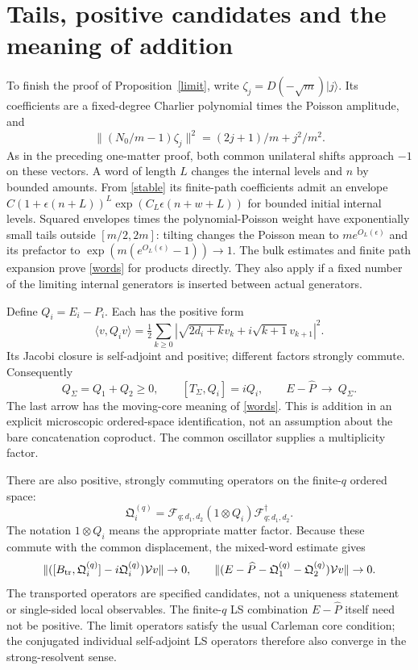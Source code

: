 \documentclass[11pt]{article}
\newcommand{\eps}{\epsilon}
\newcommand{\ket}[1]{|#1\rangle}
\newcommand{\PP}{\widehat P}
\newcommand{\Bt}{B_{\rm tr}}
\newcommand{\V}{\mathcal V}
\begin{document}
\newpage
\section{Tails, positive candidates and the meaning of addition}
To finish the proof of Proposition~\ref{limit}, write
$\zeta_j=D(-\sqrt m)\ket j$.
Its coefficients are a fixed-degree Charlier polynomial times
the Poisson amplitude, and
\[
 \|(N_0/m-1)\zeta_j\|^2=(2j+1)/m+j^2/m^2.
\]
As in the preceding one-matter proof, both common unilateral
shifts approach $-1$ on these vectors. A word of length $L$
changes the internal levels and $n$ by bounded amounts.
From \eqref{stable} its finite-path coefficients admit an envelope
$C(1+\eps(n+L))^L\exp(C_L\eps(n+w+L))$ for bounded
initial internal levels. Squared envelopes times the
polynomial-Poisson weight have exponentially small tails
outside $[m/2,2m]$: tilting changes the Poisson mean to
$me^{O_L(\eps)}$ and its prefactor to
$\exp(m(e^{O_L(\eps)}-1))\to1$.
The bulk estimates and finite path expansion prove \eqref{words}
for products directly. They also apply if a fixed number of the
limiting internal generators is inserted between actual generators.

Define $Q_i=E_i-P_i$. Each has the positive form
\[
 \langle v,Q_i v\rangle=\tfrac12\sum_{k\ge0}
 |\sqrt{2d_i+k}v_k+i\sqrt{k+1}v_{k+1}|^2.
\]
Its Jacobi closure is self-adjoint and positive; different
factors strongly commute. Consequently
\begin{equation}
 Q_\Sigma=Q_1+Q_2\ge0,\qquad [T_\Sigma,Q_i]=iQ_i,
 \qquad E-\PP\ \longrightarrow\ Q_\Sigma.\label{additive}
\end{equation}
The last arrow has the moving-core meaning of \eqref{words}.
This is addition in an explicit microscopic ordered-space
identification, not an assumption about the bare concatenation
coproduct. The common oscillator supplies a multiplicity factor.

There are also positive, strongly commuting operators on the
finite-$q$ ordered space:
\begin{equation}
 \mathfrak Q_i^{(q)}=\mathcal F_{q;d_1,d_2}
 (1\otimes Q_i)\mathcal F_{q;d_1,d_2}^{\dagger}.\label{transport}
\end{equation}
The notation $1\otimes Q_i$ means the appropriate matter factor.
Because these commute with the common displacement,
the mixed-word estimate gives
\[
 \|([\Bt,\mathfrak Q_i^{(q)}]-i\mathfrak Q_i^{(q)})\V v\|\to0,
 \qquad
 \|(E-\PP-\mathfrak Q_1^{(q)}-\mathfrak Q_2^{(q)})\V v\|\to0.
\]
The transported operators are specified candidates, not a
uniqueness statement or single-sided local observables.
The finite-$q$ LS combination $E-\PP$ itself need not be positive.
The limit operators satisfy the usual Carleman core condition;
the conjugated individual self-adjoint LS operators therefore
also converge in the strong-resolvent sense.
\end{document}
